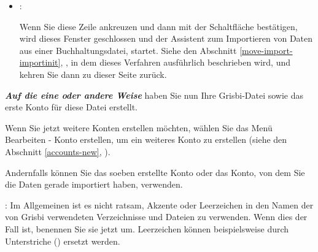 \begin{enumerate}
\begin{itemize}
		\item[\textopenbullet] :\par%
		Wenn Sie diese Zeile ankreuzen und dann mit der Schaltfläche  bestätigen, wird dieses Fenster geschlossen und der  Assistent zum Importieren von Daten aus einer Buchhaltungsdatei, startet. Siehe den Abschnitt \vref{move-import-importinit}, , in dem dieses Verfahren ausführlich beschrieben wird, und kehren Sie dann zu dieser Seite zurück.%
	\end{itemize}
\end{enumerate}

\label{start-newfile-end}

\textit{\textbf{Auf die eine oder andere Weise}} haben Sie nun Ihre Grisbi-Datei sowie das erste Konto für diese Datei erstellt.%


Wenn Sie jetzt weitere Konten erstellen möchten, wählen Sie das Menü {Bearbeiten - Konto erstellen}, um ein weiteres Konto zu erstellen (siehe den Abschnitt \vref{accounts-new}, ).%


Andernfalls können Sie das soeben erstellte Konto oder das Konto, von dem Sie die Daten gerade importiert haben, verwenden.\newline%

\Attention{}: Im Allgemeinen ist es nicht ratsam, Akzente oder Leerzeichen in den Namen der von Grisbi verwendeten Verzeichnisse und Dateien zu verwenden. Wenn dies der Fall ist, benennen Sie sie jetzt um. Leerzeichen können beispielsweise durch Unterstriche (\underline{}) ersetzt werden.%

